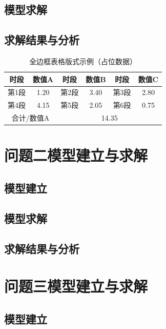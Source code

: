 \documentclass{MathorCupmodeling}
\begin{document}
\subsection{模型求解}

\subsection{求解结果与分析}

\begin{table}[H]
	\centering
	\caption{全边框表格版式示例（占位数据）}
	\begin{tabular}{|c|c|c|c|c|c|}
		\hline
		时段 & 数值A & 时段 & 数值B & 时段 & 数值C \\
		\hline
		第1段 & 1.20 & 第2段 & 3.40 & 第3段 & 2.80 \\
		\hline
		第4段 & 4.15 & 第5段 & 2.05 & 第6段 & 0.75 \\
		\hline
		\multicolumn{2}{|c|}{合计/数值A} & \multicolumn{4}{c|}{14.35} \\
		\hline
	\end{tabular}
	\label{tab:boxed_demo}
\end{table}

\section{问题二模型建立与求解}
\subsection{模型建立}

\subsection{模型求解}

\subsection{求解结果与分析}

\section{问题三模型建立与求解}
\subsection{模型建立}
\end{document}

